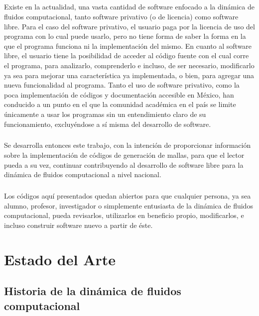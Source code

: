 \documentclass[letterpaper, openright, 12pt]{book}
\begin{document}
    \paragraph*{}
    Existe en la actualidad, una vasta cantidad de software enfocado a la
    dinámica de fluidos computacional, tanto software privativo (o de
    licencia) como software libre. Para el caso del software privativo, el
    usuario paga por la licencia de uso del programa con lo cual puede
    usarlo, pero no tiene forma de saber la forma en la que el programa
    funciona ni la implementación del mismo. En cuanto al software libre,
    el usuario tiene la posibilidad de acceder al código fuente con el cual
    corre el programa, para analizarlo, comprenderlo e incluso, de ser
    necesario, modificarlo ya sea para mejorar una característica ya
    implementada, o bien, para agregar una nueva funcionalidad al programa.
    Tanto el uso de software privativo, como la poca implementación de
    códigos y documentación accesible en México, han conducido a un punto en
    el que la comunidad académica en el país se limite únicamente a usar los
    programas sin un entendimiento claro de su funcionamiento, excluyéndose
    a sí misma del desarrollo de software.

    \paragraph*{}
    Se desarrolla entonces este trabajo, con la intención de proporcionar
    información sobre la implementación de códigos de generación de mallas,
    para que el lector pueda a su vez, continuar contribuyendo al desarrollo
    de software libre para la dinámica de fluidos computacional a nivel
    nacional.

    \paragraph*{}
    Los códigos aquí presentados quedan abiertos para que cualquier persona,
    ya sea alumno, profesor, investigador o  simplemente entusiasta de la
    dinámica de fluidos computacional, pueda revisarlos, utilizarlos en
    beneficio propio, modificarlos, e incluso construir software nuevo a
    partir de éste.
%
%
%
%

%
%
%
%
\chapter{Estado del Arte}
    \section{Historia de la dinámica de fluidos computacional}
\end{document}

